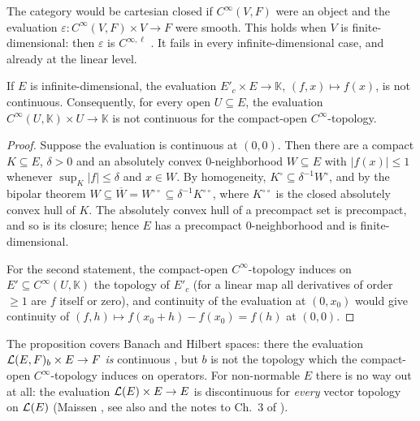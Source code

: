 The category would be cartesian closed if $C^\infty(V, F)$ were an object and the evaluation
$\varepsilon \colon C^\infty(V, F) \times V \to F$ were smooth. This holds when $V$ is
finite-dimensional: then $\varepsilon$ is $C^{\infty, \ell}$ \cite[Lemma~1.7.25]{GN26}. It
fails in every infinite-dimensional case, and already at the linear level.

\begin{proposition}
  \label{prop:evaluation-discontinuous}
  If $E$ is infinite-dimensional, the evaluation $E'_c \times E \to \mathbb{K}$,
  $(f, x) \mapsto f(x)$, is not continuous. Consequently, for every open
  $U \subseteq E$, the evaluation $C^\infty(U, \mathbb{K}) \times U \to \mathbb{K}$ is not
  continuous for the compact-open $C^\infty$-topology.
\end{proposition}

\begin{proof}
  Suppose the evaluation is continuous at $(0, 0)$. Then there are a compact $K \subseteq E$,
  $\delta > 0$ and an absolutely convex $0$-neighborhood $W \subseteq E$ with $|f(x)| \le 1$
  whenever $\sup_K |f| \le \delta$ and $x \in W$. By homogeneity, $K^\circ \subseteq
  \delta^{-1} W^\circ$, and by the bipolar theorem
  $W \subseteq \overline{W} = W^{\circ\circ} \subseteq \delta^{-1} K^{\circ\circ}$, where
  $K^{\circ\circ}$ is the closed absolutely convex hull of $K$. The absolutely convex hull of a
  precompact set is precompact, and so is its closure; hence $E$ has a precompact
  $0$-neighborhood and is finite-dimensional.

  For the second statement, the compact-open $C^\infty$-topology induces on
  $E' \subseteq C^\infty(U, \mathbb{K})$ the topology of $E'_c$ (for a linear map all
  derivatives of order $\ge 1$ are $f$ itself or zero), and continuity of the evaluation at
  $(0, x_0)$ would give continuity of $(f, h) \mapsto f(x_0 + h) - f(x_0) = f(h)$ at $(0, 0)$.
\end{proof}

The proposition covers Banach and Hilbert spaces: there the evaluation
$\mathcal{L}(E, F)_b \times E \to F$ \emph{is} continuous \cite[Rem.~2.3.9]{GN26}, but $b$ is not
the topology which the compact-open $C^\infty$-topology induces on operators. For non-normable
$E$ there is no way out at all: the evaluation $\mathcal{L}(E) \times E \to E$ is discontinuous for
\emph{every} vector topology on $\mathcal{L}(E)$ (Maissen \cite[Satz 1]{Mai63}, see also \cite[p.~2]{KM97}
and the notes to Ch.~3 of \cite{GN26}).

